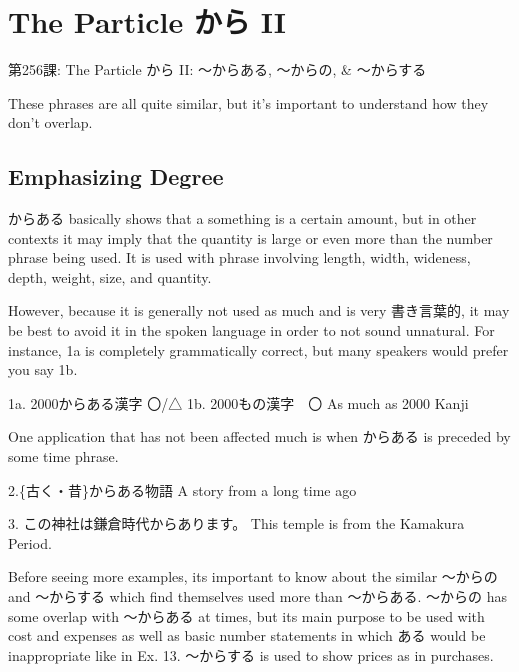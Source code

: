     
\chapter{The Particle から II}

\begin{center}
\begin{Large}
第256課: The Particle から II: ～からある, ～からの, \& ～からする 
\end{Large}
\end{center}
 
\par{ These phrases are all quite similar, but it's important to understand how they don't overlap. }
      
\section{Emphasizing Degree}
 
\par{ からある basically shows that a something is a certain amount, but in other contexts it may imply that the quantity is large or even more than the number phrase being used. It is used with phrase involving length, width, wideness, depth, weight, size, and quantity. }

\par{ However, because it is generally not used as much and is very 書き言葉的, it may be best to avoid it in the spoken language in order to not sound unnatural. For instance, 1a is completely grammatically correct, but many speakers would prefer you say 1b. }

\par{1a. 2000からある漢字 〇\slash △ \hfill\break
1b. 2000もの漢字　〇 \hfill\break
As much as 2000 Kanji }

\par{ One application that has not been affected much is when からある is preceded by some time phrase. }

\par{2.\{古く・昔\}からある物語 \hfill\break
A story from a long time ago }

\par{3. この神社は鎌倉時代からあります。 \hfill\break
This temple is from the Kamakura Period. }

\par{ Before seeing more examples, it\textquotesingle s important to know about the similar ～からの and ～からする which find themselves used more than ～からある. ～からの has some overlap with ～からある at times, but its main purpose to be used with cost and expenses as well as basic number statements in which ある would be inappropriate like in Ex. 13. ～からする is used to show prices as in purchases. }

